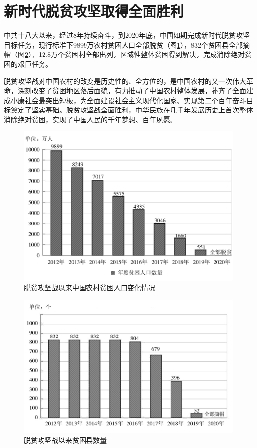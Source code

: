 \documentclass{ctexart}
\begin{document}
\section{新时代脱贫攻坚取得全面胜利}

中共十八大以来，经过8年持续奋斗，到2020年底，中国如期完成新时代脱贫攻坚目标任务，现行标准下9899万农村贫困人口全部脱贫（图\ref{fig-1}），832个贫困县全部摘帽（图\ref{fig-2}），12.8万个贫困村全部出列，区域性整体贫困得到解决，完成消除绝对贫困的艰巨任务。

脱贫攻坚战对中国农村的改变是历史性的、全方位的，是中国农村的又一次伟大革命，深刻改变了贫困地区落后面貌，有力推动了中国农村整体发展，补齐了全面建成小康社会最突出短板，为全面建设社会主义现代化国家、实现第二个百年奋斗目标奠定了坚实基础。脱贫攻坚战全面胜利，中华民族在几千年发展历史上首次整体消除绝对贫困，实现了中国人民的千年梦想、百年夙愿。

\begin{figure}[h]
    \centering
    \includegraphics{fig/1.jpg}
    \caption{脱贫攻坚战以来中国农村贫困人口变化情况}
    \label{fig-1}
\end{figure}

\begin{figure}[h]
    \centering
    \includegraphics{fig/2.jpg}
    \caption{脱贫攻坚战以来贫困县数量}
    \label{fig-2}
\end{figure}
\end{document}
